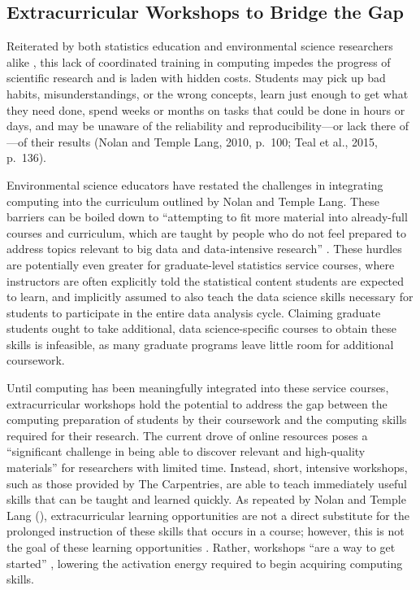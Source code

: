 \documentclass[12pt]{article}
\begin{document}
\subsection{Extracurricular Workshops to Bridge the Gap}

\noindent Reiterated by both statistics education and environmental science 
researchers alike \citep{nolan, carpentry}, this lack of coordinated training in 
computing impedes the progress of scientific research and is 
laden with hidden costs. Students may pick up bad habits, misunderstandings, or 
the wrong concepts, learn just enough to get what they need done, spend weeks or
months on tasks that could be done in hours or days, and may be unaware of 
the reliability and reproducibility---or lack there of---of their results (Nolan
and Temple Lang, 2010, p.\ 100; Teal et al., 2015, p.\ 136). 

\quad Environmental science educators have restated the challenges in 
integrating computing into the curriculum outlined by Nolan and Temple Lang. 
These barriers can be boiled down to ``attempting to fit more material into
already-full courses and curriculum, which are taught by people who do not feel
prepared to address topics relevant to big data and data-intensive research'' 
\citep[p.\ 547]{hampton}. These hurdles are potentially even greater for 
graduate-level statistics service courses, where instructors are often
explicitly told the statistical content students are expected to learn, and 
implicitly assumed to also teach the data science skills necessary for students 
to participate in the entire data analysis cycle. Claiming graduate students
ought to take additional, data science-specific courses to obtain these skills
is infeasible, as many graduate programs leave little room for
additional coursework. 

\quad Until computing has been meaningfully integrated into these service 
courses, extracurricular workshops hold the potential to address the gap between
the computing preparation of students by their coursework and the 
computing skills required for their research. The current drove of online
resources poses a ``significant challenge
in being able to discover relevant and high-quality materials'' 
\citep[p.\ 136]{carpentry} for researchers with limited time. Instead, short,
intensive workshops, such as those provided by The Carpentries, are able to
teach immediately useful skills that can be taught and learned quickly. As
repeated by Nolan and Temple Lang (\citeyear{esr}), extracurricular
learning opportunities are not a direct substitute for the prolonged instruction
of these skills that occurs in a course; however, this is not the goal of these
learning opportunities \citep{null-carpentries}. Rather, workshops ``are a way
to get started'' \citep[p.\ 143]{carpentry},  lowering the activation energy
required to begin acquiring computing skills. 
\end{document}
